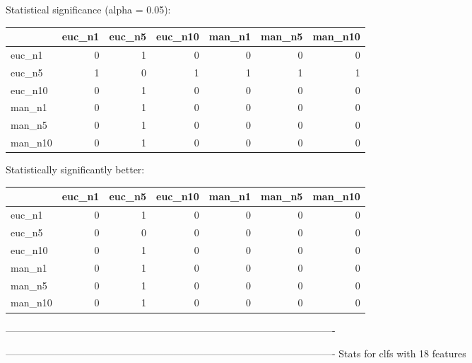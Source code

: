 Statistical significance (alpha = 0.05):
 \begin{tabular}{lrrrrrr}
\hline
         &   euc\_n1 &   euc\_n5 &   euc\_n10 &   man\_n1 &   man\_n5 &   man\_n10 \\
\hline
 euc\_n1  &        0 &        1 &         0 &        0 &        0 &         0 \\
 euc\_n5  &        1 &        0 &         1 &        1 &        1 &         1 \\
 euc\_n10 &        0 &        1 &         0 &        0 &        0 &         0 \\
 man\_n1  &        0 &        1 &         0 &        0 &        0 &         0 \\
 man\_n5  &        0 &        1 &         0 &        0 &        0 &         0 \\
 man\_n10 &        0 &        1 &         0 &        0 &        0 &         0 \\
\hline
\end{tabular} 

Statistically significantly better:
 \begin{tabular}{lrrrrrr}
\hline
         &   euc\_n1 &   euc\_n5 &   euc\_n10 &   man\_n1 &   man\_n5 &   man\_n10 \\
\hline
 euc\_n1  &        0 &        1 &         0 &        0 &        0 &         0 \\
 euc\_n5  &        0 &        0 &         0 &        0 &        0 &         0 \\
 euc\_n10 &        0 &        1 &         0 &        0 &        0 &         0 \\
 man\_n1  &        0 &        1 &         0 &        0 &        0 &         0 \\
 man\_n5  &        0 &        1 &         0 &        0 &        0 &         0 \\
 man\_n10 &        0 &        1 &         0 &        0 &        0 &         0 \\
\hline
\end{tabular} 

----------------------------------------------------------------------------------------------------



----------------------------------------------------------------------------------------------------
Stats for clfs with 18 features


